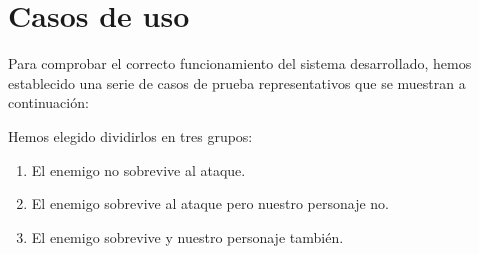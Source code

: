 \section{Casos de uso}

Para comprobar el correcto funcionamiento del sistema desarrollado, hemos establecido una serie de casos de prueba representativos que se muestran a continuación:






Hemos elegido dividirlos en tres grupos:
\begin{enumerate}
	\item El enemigo no sobrevive al ataque.
	\item El enemigo sobrevive al ataque pero nuestro personaje no.
	\item El enemigo sobrevive y nuestro personaje también.
\end{enumerate}

